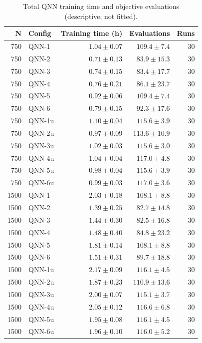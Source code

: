 \begin{table}[htbp]
\centering
\small
\caption{Total QNN training time and objective evaluations (descriptive; not fitted).}
\label{tab:t5c}
\begin{tabular}{rlrrr}
\toprule
N & Config & Training time (h) & Evaluations & Runs \\
\midrule
750 & QNN-1 & $1.04 \pm 0.07$ & $109.4 \pm 7.4$ & 30 \\
750 & QNN-2 & $0.71 \pm 0.13$ & $83.9 \pm 15.3$ & 30 \\
750 & QNN-3 & $0.74 \pm 0.15$ & $83.4 \pm 17.7$ & 30 \\
750 & QNN-4 & $0.76 \pm 0.21$ & $86.1 \pm 23.7$ & 30 \\
750 & QNN-5 & $0.92 \pm 0.06$ & $109.4 \pm 7.4$ & 30 \\
750 & QNN-6 & $0.79 \pm 0.15$ & $92.3 \pm 17.6$ & 30 \\
750 & QNN-1u & $1.10 \pm 0.04$ & $115.6 \pm 3.9$ & 30 \\
750 & QNN-2u & $0.97 \pm 0.09$ & $113.6 \pm 10.9$ & 30 \\
750 & QNN-3u & $1.02 \pm 0.03$ & $115.6 \pm 3.0$ & 30 \\
750 & QNN-4u & $1.04 \pm 0.04$ & $117.0 \pm 4.8$ & 30 \\
750 & QNN-5u & $0.98 \pm 0.04$ & $115.6 \pm 3.9$ & 30 \\
750 & QNN-6u & $0.99 \pm 0.03$ & $117.0 \pm 3.6$ & 30 \\
\midrule
1500 & QNN-1 & $2.03 \pm 0.18$ & $108.1 \pm 8.8$ & 30 \\
1500 & QNN-2 & $1.39 \pm 0.25$ & $82.7 \pm 14.8$ & 30 \\
1500 & QNN-3 & $1.44 \pm 0.30$ & $82.5 \pm 16.8$ & 30 \\
1500 & QNN-4 & $1.48 \pm 0.40$ & $84.8 \pm 23.2$ & 30 \\
1500 & QNN-5 & $1.81 \pm 0.14$ & $108.1 \pm 8.8$ & 30 \\
1500 & QNN-6 & $1.51 \pm 0.31$ & $89.7 \pm 18.8$ & 30 \\
1500 & QNN-1u & $2.17 \pm 0.09$ & $116.1 \pm 4.5$ & 30 \\
1500 & QNN-2u & $1.87 \pm 0.23$ & $110.9 \pm 13.6$ & 30 \\
1500 & QNN-3u & $2.00 \pm 0.07$ & $115.1 \pm 3.7$ & 30 \\
1500 & QNN-4u & $2.05 \pm 0.12$ & $116.6 \pm 6.8$ & 30 \\
1500 & QNN-5u & $1.95 \pm 0.08$ & $116.1 \pm 4.5$ & 30 \\
1500 & QNN-6u & $1.96 \pm 0.10$ & $116.0 \pm 5.2$ & 30 \\

\end{tabular}
\end{table}
